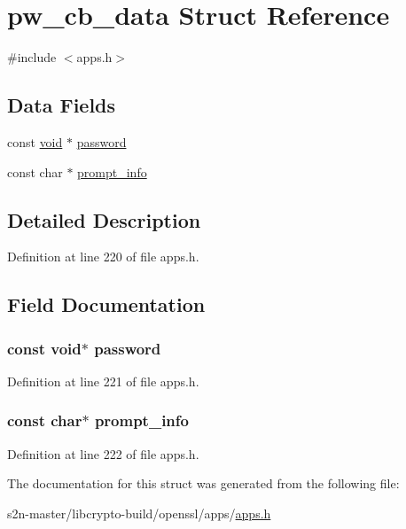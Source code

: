 \hypertarget{structpw__cb__data}{}\section{pw\+\_\+cb\+\_\+data Struct Reference}
\label{structpw__cb__data}


{\ttfamily \#include $<$apps.\+h$>$}

\subsection*{Data Fields}
\begin{DoxyCompactItemize}
\item 
const \hyperlink{hw__4758__cca_8h_afad4d591c7931ff6dc5bf69c76c96aa0}{void} $\ast$ \hyperlink{structpw__cb__data_a5a52ba0824c9d46ff2ce46684940e009}{password}
\item 
const char $\ast$ \hyperlink{structpw__cb__data_a6ebc829f98a5903577d63f40cfb92708}{prompt\+\_\+info}
\end{DoxyCompactItemize}


\subsection{Detailed Description}


Definition at line 220 of file apps.\+h.



\subsection{Field Documentation}
\subsubsection[{\texorpdfstring{password}{password}}]{\setlength{\rightskip}{0pt plus 5cm}const {\bf void}$\ast$ password}\hypertarget{structpw__cb__data_a5a52ba0824c9d46ff2ce46684940e009}{}\label{structpw__cb__data_a5a52ba0824c9d46ff2ce46684940e009}


Definition at line 221 of file apps.\+h.

\subsubsection[{\texorpdfstring{prompt\+\_\+info}{prompt_info}}]{\setlength{\rightskip}{0pt plus 5cm}const char$\ast$ prompt\+\_\+info}\hypertarget{structpw__cb__data_a6ebc829f98a5903577d63f40cfb92708}{}\label{structpw__cb__data_a6ebc829f98a5903577d63f40cfb92708}


Definition at line 222 of file apps.\+h.



The documentation for this struct was generated from the following file\+:\begin{DoxyCompactItemize}
\item 
s2n-\/master/libcrypto-\/build/openssl/apps/\hyperlink{apps_8h}{apps.\+h}\end{DoxyCompactItemize}
